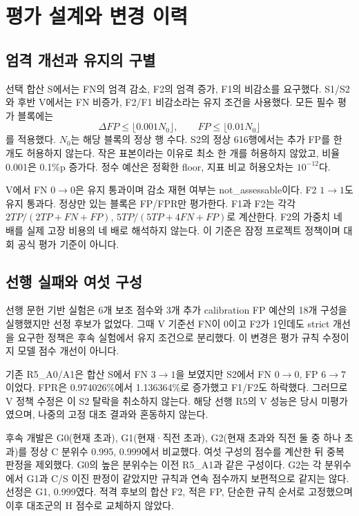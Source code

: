 \documentclass{article}
\begin{document}
\section{평가 설계와 변경 이력}
\subsection{엄격 개선과 유지의 구별}
선택 합산 S에서는 FN의 엄격 감소, F2의 엄격 증가, F1의 비감소를 요구했다. S1/S2와 후반 V에서는 FN 비증가, F2/F1 비감소라는 유지 조건을 사용했다. 모든 필수 평가 블록에는
\begin{equation}
\Delta FP\le\lfloor0.001N_0\rfloor,\qquad
FP\le\lfloor0.01N_0\rfloor
\end{equation}
를 적용했다. $N_0$는 해당 블록의 정상 행 수다. S2의 정상 616행에서는 추가 FP를 한 개도 허용하지 않는다. 작은 표본이라는 이유로 최소 한 개를 허용하지 않았고, 비율 0.001은 0.1\%p 증가다. 정수 예산은 정확한 floor, 지표 비교 허용오차는 $10^{-12}$다.

V에서 FN $0\to0$은 유지 통과이며 감소 재현 여부는 not\_assessable이다. F2 $1\to1$도 유지 통과다. 정상만 있는 블록은 FP/FPR만 평가한다. F1과 F2는 각각 $2TP/(2TP+FN+FP)$, $5TP/(5TP+4FN+FP)$로 계산한다. F2의 가중치 네 배를 실제 고장 비용의 네 배로 해석하지 않는다. 이 기준은 잠정 프로젝트 정책이며 대회 공식 평가 기준이 아니다.

\subsection{선행 실패와 여섯 구성}
선행 문헌 기반 실험은 6개 보조 점수와 3개 추가 calibration FP 예산의 18개 구성을 실행했지만 선정 후보가 없었다. 그때 V 기준선 FN이 0이고 F2가 1인데도 strict 개선을 요구한 정책은 후속 실험에서 유지 조건으로 분리했다. 이 변경은 평가 규칙 수정이지 모델 점수 개선이 아니다.

기존 R5\_A0/A1은 합산 S에서 FN $3\to1$을 보였지만 S2에서 FN $0\to0$, FP $6\to7$이었다. FPR은 0.974026\%에서 1.136364\%로 증가했고 F1/F2도 하락했다. 그러므로 V 정책 수정은 이 S2 탈락을 취소하지 않는다. 해당 선행 R5의 V 성능은 당시 미평가였으며, 나중의 고정 대조 결과와 혼동하지 않는다.

후속 개발은 G0(현재 초과), G1(현재·직전 초과), G2(현재 초과와 직전 둘 중 하나 초과)를 정상 C 분위수 0.995, 0.999에서 비교했다. 여섯 구성의 점수를 계산한 뒤 중복 판정을 제외했다. G0의 높은 분위수는 이전 R5\_A1과 같은 구성이다. G2는 각 분위수에서 G1과 C/S 이진 판정이 같았지만 규칙과 연속 점수까지 보편적으로 같지는 않다. 선정은 G1, 0.999였다. 적격 후보의 합산 F2, 적은 FP, 단순한 규칙 순서로 고정했으며 이후 대조군의 H 점수로 교체하지 않았다.
\end{document}
